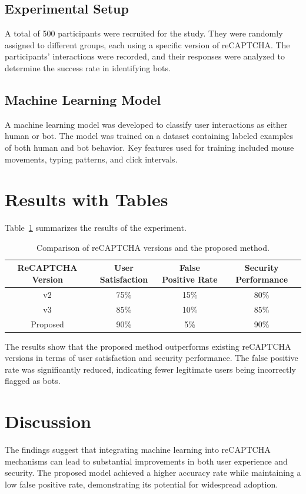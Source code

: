 \documentclass{article}
\begin{document}
\subsection{Experimental Setup}
A total of 500 participants were recruited for the study. They were randomly assigned to different groups, each using a specific version of reCAPTCHA. The participants' interactions were recorded, and their responses were analyzed to determine the success rate in identifying bots.

\subsection{Machine Learning Model}
A machine learning model was developed to classify user interactions as either human or bot. The model was trained on a dataset containing labeled examples of both human and bot behavior. Key features used for training included mouse movements, typing patterns, and click intervals.

\section{Results with Tables}
Table~\ref{tab:results} summarizes the results of the experiment.

\begin{table}[ht]
\centering
\begin{tabular}{|c|c|c|c|}
\hline
\textbf{ReCAPTCHA Version} & \textbf{User Satisfaction} & \textbf{False Positive Rate} & \textbf{Security Performance} \\
\hline
v2 & 75\% & 15\% & 80\% \\
\hline
v3 & 85\% & 10\% & 85\% \\
\hline
Proposed & 90\% & 5\% & 90\% \\
\hline
\end{tabular}
\caption{Comparison of reCAPTCHA versions and the proposed method.}
\label{tab:results}
\end{table}

The results show that the proposed method outperforms existing reCAPTCHA versions in terms of user satisfaction and security performance. The false positive rate was significantly reduced, indicating fewer legitimate users being incorrectly flagged as bots.

\section{Discussion}
The findings suggest that integrating machine learning into reCAPTCHA mechanisms can lead to substantial improvements in both user experience and security. The proposed model achieved a higher accuracy rate while maintaining a low false positive rate, demonstrating its potential for widespread adoption.
\end{document}
